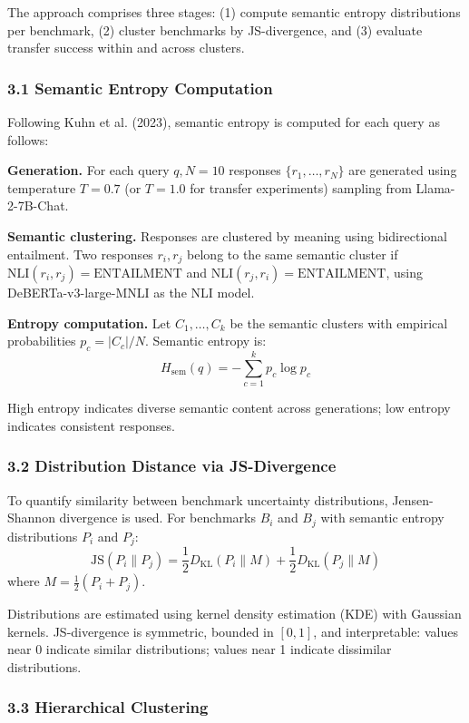 
The approach comprises three stages: (1) compute semantic entropy distributions per benchmark, (2) cluster benchmarks by JS-divergence, and (3) evaluate transfer success within and across clusters.

\subsubsection{3.1 Semantic Entropy Computation}

Following Kuhn et al. (2023), semantic entropy is computed for each query as follows:

\textbf{Generation.} For each query $q, N=10$ responses $\{r_1, \ldots, r_N\}$ are generated using temperature $T=0.7$ (or $T=1.0$ for transfer experiments) sampling from Llama-2-7B-Chat.

\textbf{Semantic clustering.} Responses are clustered by meaning using bidirectional entailment. Two responses $r_i, r_j$ belong to the same semantic cluster if $\text{NLI}(r_i, r_j) = \text{ENTAILMENT}$ and $\text{NLI}(r_j, r_i) = \text{ENTAILMENT}$, using DeBERTa-v3-large-MNLI as the NLI model.

\textbf{Entropy computation.} Let $C_1, \ldots, C_k$ be the semantic clusters with empirical probabilities $p_c = |C_c|/N$. Semantic entropy is:
$$H_{\text{sem}}(q) = -\sum_{c=1}^{k} p_c \log p_c$$

High entropy indicates diverse semantic content across generations; low entropy indicates consistent responses.

\subsubsection{3.2 Distribution Distance via JS-Divergence}

To quantify similarity between benchmark uncertainty distributions, Jensen-Shannon divergence is used. For benchmarks $B_i$ and $B_j$ with semantic entropy distributions $P_i$ and $P_j$:
$$\text{JS}(P_i \| P_j) = \frac{1}{2} D_{\text{KL}}(P_i \| M) + \frac{1}{2} D_{\text{KL}}(P_j \| M)$$
where $M = \frac{1}{2}(P_i + P_j)$.

Distributions are estimated using kernel density estimation (KDE) with Gaussian kernels. JS-divergence is symmetric, bounded in $[0, 1]$, and interpretable: values near 0 indicate similar distributions; values near 1 indicate dissimilar distributions.

\subsubsection{3.3 Hierarchical Clustering}

